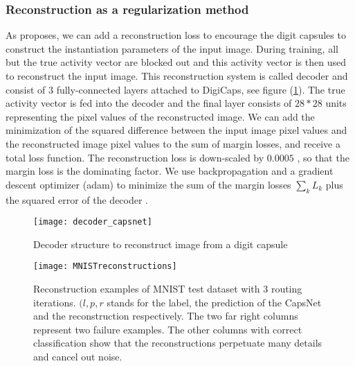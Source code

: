 \documentclass{article}
\begin{document}
{\subsubsection{Reconstruction as a regularization method}

As \cite{hinton17} proposes, we can add a reconstruction loss to encourage the digit capsules to construct the instantiation parameters of the input image. During training, all but the true activity vector are blocked out and this activity vector is then used to reconstruct the input image. This reconstruction system is called decoder \cite{hinton17} and consist of $3$ fully-connected layers attached to DigiCaps, see figure (\ref{decoder_pic}). The true activity vector is fed into the decoder and the final layer consists of $28*28$ units representing the pixel values of the reconstructed image. We can add the minimization of the squared difference between the input image pixel values and the reconstructed image pixel values to the sum of margin losses, and receive a total loss function. The reconstruction loss is down-scaled by $0.0005$ \cite{hinton17}, so that the margin loss is the dominating factor. We use backpropagation and a gradient descent optimizer (adam) to minimize the sum of the margin losses $\sum_k L_k$ plus the squared error of the decoder \cite{hinton17}.\\

\begin{figure}[!htb]
\vskip 0.2in
\begin{center}
\centerline{\texttt{[image: decoder\_capsnet]}}
\caption{Decoder structure to reconstruct image from a digit capsule \cite{hinton17}}\label{decoder_pic}
\end{center}
\vskip -0.2in
\end{figure}

\begin{figure}[!htb]
\vskip 0.2in
\begin{center}
\centerline{\texttt{[image: MNISTreconstructions]}}
\caption{ \cite{hinton17} Reconstruction examples of MNIST test dataset with $3$ routing iterations. $(l,p,r$ stands for the label, the prediction of the CapsNet and the reconstruction respectively. The two far right columns represent two failure examples. The other columns with correct classification show that the reconstructions perpetuate many details and cancel out noise.}
\end{center}
\vskip -0.2in
\end{figure}

}
\end{document}
